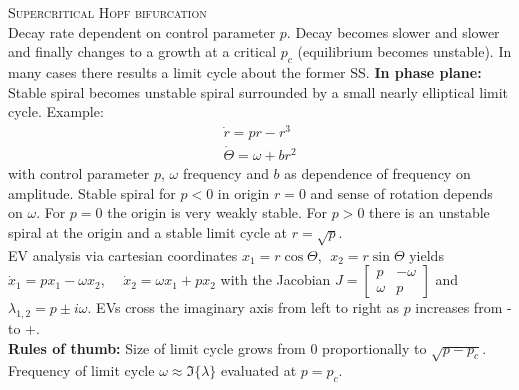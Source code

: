 \textsc{Supercritical Hopf bifurcation}\\
Decay rate dependent on control parameter $p$. Decay becomes slower and slower and finally changes to a growth at a critical $p_c$ (equilibrium becomes unstable). In many cases there results a limit cycle about the former SS. \textbf{In phase plane:} Stable spiral becomes unstable spiral surrounded by a small nearly elliptical limit cycle.
Example:
\begin{align*}
\dot{r}=pr-r^3\\
\dot{\Theta}=\omega+br^2
\end{align*}
with control parameter $p$, $\omega$ frequency and $b$ as dependence of frequency on amplitude. Stable spiral for $p<0$ in origin $r=0$ and sense of rotation depends on $\omega$. For $p=0$ the origin is very weakly stable. For $p>0$ there is an unstable spiral at the origin and a stable limit cycle at $r=\sqrt{p}$.\\
EV analysis via cartesian coordinates $x_1=r\cos \Theta$, $\;x_2=r\sin \Theta$ yields $\dot{x}_1 = px_1-\omega x_2$, $\quad\dot{x}_2 = \omega x_1+p x_2$ with the Jacobian $J=\begin{bmatrix}
p & -\omega \\ \omega & p
\end{bmatrix}$ and $\lambda_{1,2} = p \pm i\omega$. EVs cross the imaginary axis from left to right as $p$ increases from - to +. \\
\textbf{Rules of thumb:} Size of limit cycle grows from 0 proportionally to $\sqrt{p-p_c}$. Frequency of limit cycle $\omega \approx \Im \{\lambda\}$ evaluated at $p=p_c$.
\begin{center}
\end{center}
\vspace{0.2cm}

